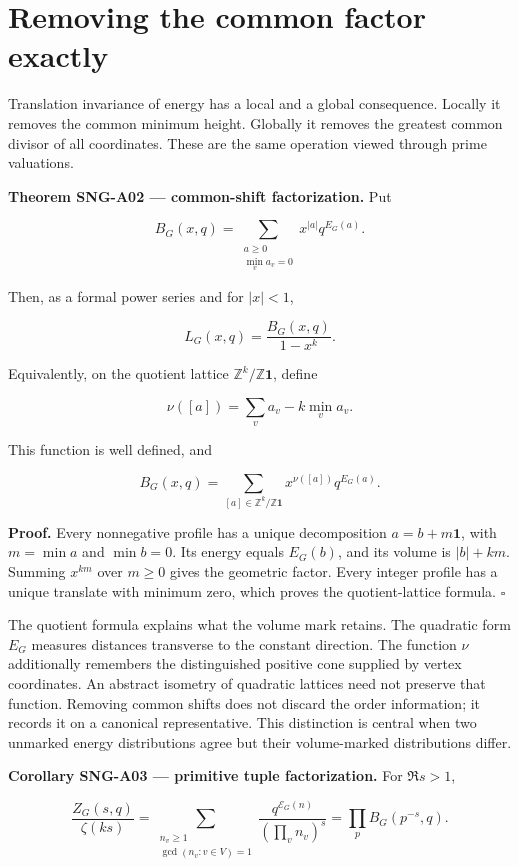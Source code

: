 \documentclass[
  11pt,
  a4paper,
]{report}
\begin{document}
\hypertarget{removing-the-common-factor-exactly}{%
\section{Removing the common factor
exactly}\label{removing-the-common-factor-exactly}}

Translation invariance of energy has a local and a global consequence.
Locally it removes the common minimum height. Globally it removes the
greatest common divisor of all coordinates. These are the same operation
viewed through prime valuations.

\textbf{Theorem SNG-A02 --- common-shift factorization.} Put

\[
 B_G(x,q)=\sum_{\substack{a\ge0\\\min_va_v=0}}x^{|a|}q^{E_G(a)}.
\]

Then, as a formal power series and for \(|x|<1\),

\[
 L_G(x,q)=\frac{B_G(x,q)}{1-x^k}.
\]

Equivalently, on the quotient lattice \(\mathbb Z^k/\mathbb Z\mathbf1\),
define

\[
 \nu([a])=\sum_va_v-k\min_va_v.
\]

This function is well defined, and

\[
 B_G(x,q)=\sum_{[a]\in\mathbb Z^k/\mathbb Z\mathbf1}
 x^{\nu([a])}q^{E_G(a)}.
\]

\textbf{Proof.} Every nonnegative profile has a unique decomposition
\(a=b+m\mathbf1\), with \(m=\min a\) and \(\min b=0\). Its energy equals
\(E_G(b)\), and its volume is \(|b|+km\). Summing \(x^{km}\) over
\(m\ge0\) gives the geometric factor. Every integer profile has a unique
translate with minimum zero, which proves the quotient-lattice formula.
\(\square\)

The quotient formula explains what the volume mark retains. The
quadratic form \(E_G\) measures distances transverse to the constant
direction. The function \(\nu\) additionally remembers the distinguished
positive cone supplied by vertex coordinates. An abstract isometry of
quadratic lattices need not preserve that function. Removing common
shifts does not discard the order information; it records it on a
canonical representative. This distinction is central when two unmarked
energy distributions agree but their volume-marked distributions differ.

\textbf{Corollary SNG-A03 --- primitive tuple factorization.} For
\(\Re s>1\),

\[
 \frac{Z_G(s,q)}{\zeta(ks)}
 =\sum_{\substack{n_v\ge1\\\gcd(n_v:v\in V)=1}}
 \frac{q^{\mathcal E_G(n)}}{(\prod_vn_v)^s}
 =\prod_pB_G(p^{-s},q).
\]
\end{document}

